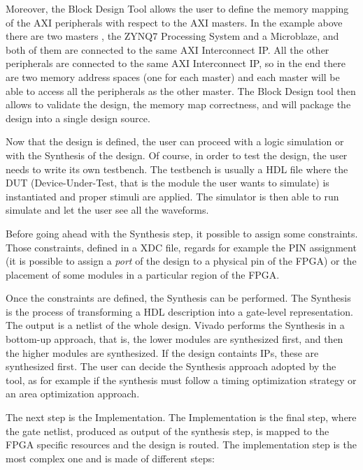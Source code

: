 Moreover, the Block Design Tool allows the user to define the memory mapping of the AXI peripherals with respect to the AXI masters. In the example above there are two masters , the ZYNQ7 Processing System and a Microblaze, and both of them are connected to the same AXI Interconnect IP. All the other peripherals are connected to the same AXI Interconnect IP, so in the end there are two memory address spaces (one for each master) and each master will be able to access all the peripherals as the other master. The Block Design tool then allows to validate the design, the memory map correctness, and will package the design into a single design source. \bigskip

Now that the design is defined, the user can proceed with a logic simulation or with the Synthesis of the design. Of course, in order to test the design, the user needs to write its own testbench. The testbench is usually a HDL file where the DUT (Device-Under-Test, that is the module the user wants to simulate) is instantiated and proper stimuli are applied. The simulator is then able to run simulate and let the user see all the waveforms. \bigskip

Before going ahead with the Synthesis step, it possible to assign some constraints. Those constraints, defined in a XDC file, regards for example the PIN assignment (it is possible to assign a \textit{port} of the design to a physical pin of the FPGA) or the placement of some modules in a particular region of the FPGA. \bigskip

Once the constraints are defined, the Synthesis can be performed. The Synthesis is the process of transforming a HDL description into a gate-level representation. The output is a netlist of the whole design. Vivado performs the Synthesis in a bottom-up approach, that is, the lower modules are synthesized first, and then the higher modules are synthesized. If the design containts IPs, these are synthesized first. The user can decide the Synthesis approach adopted by the tool, as for example if the synthesis must follow a timing optimization strategy or an area optimization approach. \bigskip

The next step is the Implementation. The Implementation is the final step, where the gate netlist, produced as output of the synthesis step, is mapped to the FPGA specific resources and the design is routed. The implementation step is the most complex one and is made of different steps:

